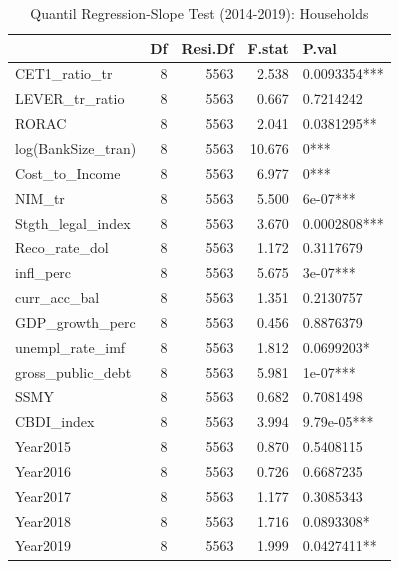 \begin{table}[ht]
\centering
\caption{Quantil Regression-Slope Test (2014-2019): Households} 
\begingroup\small
\begin{tabular}{lrrrl}
  \toprule
 & Df & Resi.Df & F.stat & P.val \\ 
  \midrule
CET1\_ratio\_tr & 8 & 5563 & 2.538 & 0.0093354*** \\ 
  LEVER\_tr\_ratio & 8 & 5563 & 0.667 & 0.7214242 \\ 
  RORAC & 8 & 5563 & 2.041 & 0.0381295** \\ 
  log(BankSize\_tran) & 8 & 5563 & 10.676 & 0*** \\ 
  Cost\_to\_Income & 8 & 5563 & 6.977 & 0*** \\ 
  NIM\_tr & 8 & 5563 & 5.500 & 6e-07*** \\ 
  Stgth\_legal\_index & 8 & 5563 & 3.670 & 0.0002808*** \\ 
  Reco\_rate\_dol & 8 & 5563 & 1.172 & 0.3117679 \\ 
  infl\_perc & 8 & 5563 & 5.675 & 3e-07*** \\ 
  curr\_acc\_bal & 8 & 5563 & 1.351 & 0.2130757 \\ 
  GDP\_growth\_perc & 8 & 5563 & 0.456 & 0.8876379 \\ 
  unempl\_rate\_imf & 8 & 5563 & 1.812 & 0.0699203* \\ 
  gross\_public\_debt & 8 & 5563 & 5.981 & 1e-07*** \\ 
  SSMY & 8 & 5563 & 0.682 & 0.7081498 \\ 
  CBDI\_index & 8 & 5563 & 3.994 & 9.79e-05*** \\ 
  Year2015 & 8 & 5563 & 0.870 & 0.5408115 \\ 
  Year2016 & 8 & 5563 & 0.726 & 0.6687235 \\ 
  Year2017 & 8 & 5563 & 1.177 & 0.3085343 \\ 
  Year2018 & 8 & 5563 & 1.716 & 0.0893308* \\ 
  Year2019 & 8 & 5563 & 1.999 & 0.0427411** \\ 
   \bottomrule
\end{tabular}
\endgroup
\end{table}

